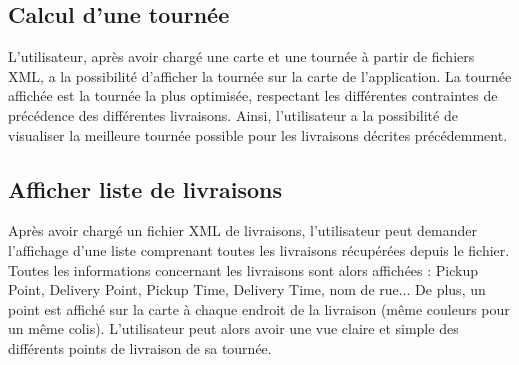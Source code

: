 \documentclass{scrartcl}
\begin{document}
\subsection{Calcul d'une tournée}
L'utilisateur, après avoir chargé une carte et une tournée à partir de fichiers XML, a la possibilité d'afficher la tournée sur la carte de l'application. La tournée affichée est la tournée la plus optimisée, respectant les différentes contraintes de précédence des différentes livraisons. Ainsi, l'utilisateur a la possibilité de visualiser la meilleure tournée possible pour les livraisons décrites précédemment.

\subsection{Afficher liste de livraisons}
Après avoir chargé un fichier XML de livraisons, l'utilisateur peut demander l'affichage d'une liste comprenant toutes les livraisons récupérées depuis le fichier. Toutes les informations concernant les livraisons sont alors affichées : Pickup Point, Delivery Point, Pickup Time, Delivery Time, nom de rue...
De plus, un point est affiché sur la carte à chaque endroit de la livraison (même couleurs pour un même colis). L'utilisateur peut alors avoir une vue claire et simple des différents points de livraison de sa tournée.
\end{document}
